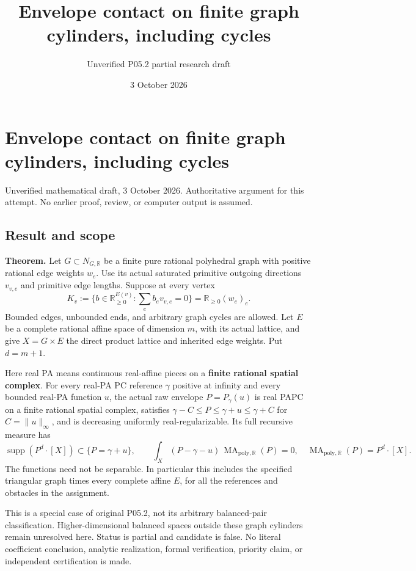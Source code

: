 \documentclass[
  11pt,
]{article}
\title{Envelope contact on finite graph cylinders, including cycles}
\author{Unverified P05.2 partial research draft}
\date{3 October 2026}
\begin{document}
\maketitle

\section{Envelope contact on finite graph cylinders, including
cycles}\label{envelope-contact-on-finite-graph-cylinders-including-cycles}

Unverified mathematical draft, 3 October 2026. Authoritative argument
for this attempt. No earlier proof, review, or computer output is
assumed.

\subsection{Result and scope}\label{result-and-scope}

\textbf{Theorem.} Let \(G\subset N_{G,\mathbb R}\) be a finite pure
rational polyhedral graph with positive rational edge weights \(w_e\).
Use its actual saturated primitive outgoing directions \(v_{v,e}\) and
primitive edge lengths. Suppose at every vertex \[
 K_v:=\{b\in\mathbb R_{\geq0}^{E(v)}:\sum_e b_ev_{v,e}=0\}
       =\mathbb R_{\geq0}(w_e)_e.                 \tag{1}
\] Bounded edges, unbounded ends, and arbitrary graph cycles are
allowed. Let \(E\) be a complete rational affine space of dimension
\(m\), with its actual lattice, and give \(X=G\times E\) the direct
product lattice and inherited edge weights. Put \(d=m+1\).

Here real PA means continuous real-affine pieces on a \textbf{finite
rational spatial complex}. For every real-PA PC reference \(\gamma\)
positive at infinity and every bounded real-PA function \(u\), the
actual raw envelope \(P=P_\gamma(u)\) is real PAPC on a finite rational
spatial complex, satisfies \(\gamma-C\leq P\leq\gamma+u\leq\gamma+C\)
for \(C=\|u\|_\infty\), and is decreasing uniformly real-regularizable.
Its full recursive measure has \[
 \operatorname{supp}(P^d\cdot[X])\subset\{P=\gamma+u\},\qquad
 \int_X(P-\gamma-u)\,\operatorname{MA}_{\mathrm{poly},\mathbb R}(P)=0,
 \quad \operatorname{MA}_{\mathrm{poly},\mathbb R}(P)=P^d\cdot[X]. \tag{2}
\] The functions need not be separable. In particular this includes the
specified triangular graph times every complete affine \(E\), for all
the references and obstacles in the assignment.

This is a special case of original P05.2, not its arbitrary
balanced-pair classification. Higher-dimensional balanced spaces outside
these graph cylinders remain unresolved here. Status is partial and
candidate is false. No literal coefficient conclusion, analytic
realization, formal verification, priority claim, or independent
certification is made.
\end{document}
